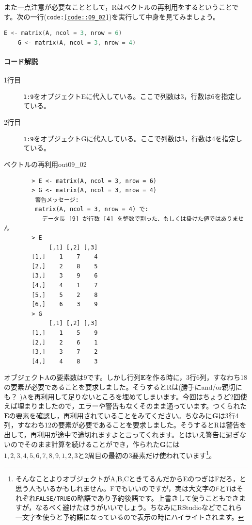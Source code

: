 \documentclass{ltjsbook}
\begin{document}
また一点注意が必要なこととして，Rはベクトルの再利用をするということです。次の一行(\texttt{code:\ref{code::09_02}})を実行して中身を見てみましょう。

\begin{lstlisting}[language=c++,label={code::09_02},caption={ベクトルデータの保持}]
    E <- matrix(A, ncol = 3, nrow = 6)
    G <- matrix(A, ncol = 3, nrow = 4)
\end{lstlisting}
\paragraph{コード解説}
\begin{description}
    \item[1行目] \texttt{1:9}をオブジェクトEに代入している。ここで列数は3，行数は6を指定している。
    \item[2行目] \texttt{1:9}をオブジェクトGに代入している。ここで列数は3，行数は4を指定している。
\end{description}

\begin{Rscreen}{ベクトルの再利用}{out09_02}
    \begin{verbatim}
        > E <- matrix(A, ncol = 3, nrow = 6)
        > G <- matrix(A, ncol = 3, nrow = 4)
         警告メッセージ: 
         matrix(A, ncol = 3, nrow = 4) で: 
           データ長 [9] が行数 [4] を整数で割った、もしくは掛けた値ではありません 
        > E
             [,1] [,2] [,3]
        [1,]    1    7    4
        [2,]    2    8    5
        [3,]    3    9    6
        [4,]    4    1    7
        [5,]    5    2    8
        [6,]    6    3    9
        > G
             [,1] [,2] [,3]
        [1,]    1    5    9
        [2,]    2    6    1
        [3,]    3    7    2
        [4,]    4    8    3
\end{verbatim}
\end{Rscreen}

オブジェクトAの要素数は9です。しかし行列$\bm{E}$を作る時に，3行6列，すなわち18の要素が必要であることを要求しました。そうするとRは(勝手にand/or親切にも？ )Aを再利用して足りないところを埋めてしまいます。今回はちょうど2回使えば埋まりましたので，エラーや警告もなくそのまま通っています。つくられた$\bm{E}$の要素を確認し，再利用されていることをみてください。ちなみに$\bm{G}$は3行4列，すなわち12の要素が必要であることを要求しました。そうするとRは警告を出して，再利用が途中で途切れますよと言ってくれます。とはいえ警告に過ぎないのでそのまま計算を続けることができ，作られた$\bm{G}$には$1,2,3,4,5,6,7,8,9,1,2,3$と2周目の最初の3要素だけ使われています\footnote{そんなことよりオブジェクトがA,B,CときてるんだからEのつぎはFだろ，と思う人もいるかもしれません。Fでもいいのですが，実は大文字の\texttt{F}と\texttt{T}はそれぞれ\texttt{FALSE/TRUE}の略語であり予約後語です。上書きして使うこともできますが，なるべく避けたほうがいいでしょう。ちなみにRStudioなどでこれら一文字を使うと予約語になっているので表示の時にハイライトされます。}。
\end{document}

